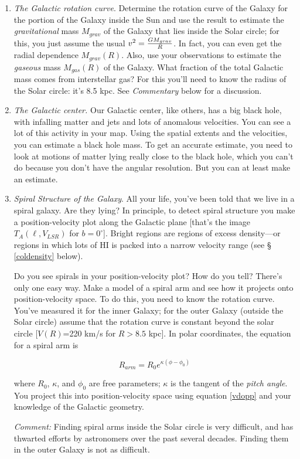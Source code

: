 \documentclass[psfig,preprint]{aastex}
\begin{document}
\begin{enumerate}

	\item {\it The Galactic rotation curve}. Determine the rotation
curve of the Galaxy for the portion of the Galaxy inside the Sun and use
the result to estimate the {\it gravitational} mass $M_{grav}$ of the
Galaxy that lies inside the Solar circle; for this, you just assume the
usual $v^2 = {G M_{grav} \over R}$.  In fact, you can even get the
radial dependence $M_{grav}(R)$. Also, use your observations to estimate
the {\it gaseous} mass $M_{gas}(R)$ of the Galaxy.  What fraction of the
total Galactic mass comes from interstellar gas? For this you'll need to
know the radius of the Solar circle: it's 8.5 kpc.  See {\it Commentary}
below for a discussion. 

\item {\it The Galactic center.} Our Galactic center, like others, has a
  big black hole, with infalling matter and jets and lots of anomalous
  velocities. You can see a lot of this activity in  your map. Using the
  spatial extents and the velocities, you can estimate a black hole
  mass. To get an accurate estimate, you need to look at motions of
  matter lying really close to the black hole, which you can't do
  because you don't have the angular resolution. But you can at least
  make an estimate.

	\item {\it Spiral Structure of the Galaxy}. All your life,
you've been told that we live in a spiral galaxy.  Are they lying? In
principle, to detect spiral structure you make a position-velocity plot
along the Galactic plane [that's the image $T_A(\ell,V_{LSR})$ for
$b=0^\circ$].  Bright regions are regions of excess density---or regions in
which lots of HI is packed into a narrow velocity range (see \S
\ref{coldensity} below). 

	Do you see spirals in your position-velocity plot? How do you
tell? There's only one easy way.  Make a model of a spiral arm and see
how it projects onto position-velocity space.  To do this, you need to
know the rotation curve.  You've measured it for the inner Galaxy; for
the outer Galaxy (outside the Solar circle) assume that the rotation
curve is constant beyond the solar circle [$V(R)$=220 km/s for $R > 8.5$
kpc].  In polar coordinates, the equation for a spiral arm is

\begin{equation}
R_{arm}  =  R_0 e^ {\kappa (\phi - \phi_0)} 
\end{equation}

\noindent where $R_0$, $\kappa$, and $\phi_0$ are free parameters;
$\kappa$ is the tangent of the {\it pitch angle}.  You project this into
position-velocity space using equation \ref{vdopp} and your knowledge of
the Galactic geometry.  

{\it Comment:} Finding spiral arms inside the Solar circle is very
difficult, and has thwarted efforts by astronomers over the past several
decades. Finding them in the outer Galaxy is not as difficult.

\end{enumerate}
\end{document}
